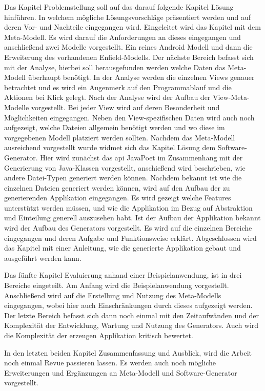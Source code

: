 Das Kapitel Problemstellung soll auf das darauf folgende Kapitel Lösung hinführen. In welchem mögliche Lösungsvorschläge präsentiert werden und auf deren Vor- und Nachteile eingegangen wird. Eingeleitet wird das Kapitel mit dem Meta-Modell. Es wird darauf die Anforderungen an dieses eingegangen und anschließend zwei Modelle vorgestellt. Ein reines Android Modell und dann die Erweiterung des vorhandenen Enfield-Modells. Der nächste Bereich befasst sich mit der Analyse, hierbei soll herausgefunden werden welche Daten das Meta-Modell überhaupt benötigt. In der Analyse werden die einzelnen Views genauer betrachtet und es wird ein Augenmerk auf den Programmablauf und die Aktionen bei Klick gelegt. Nach der Analyse wird der Aufbau der View-Meta-Modelle vorgestellt. Bei jeder View wird auf deren Besonderheit und Möglichkeiten eingegangen. Neben den View-spezifischen Daten wird auch noch aufgezeigt, welche Dateien allgemein benötigt werden und wo diese im vorgegebenen Modell platziert werden sollten. Nachdem das Meta-Modell ausreichend vorgestellt wurde widmet sich das Kapitel Lösung dem Software-Generator. Hier wird zunächst das \acf{api} JavaPoet im Zusammenhang mit der Generierung von Java-Klassen vorgestellt, anschießend wird beschrieben, wie andere Datei-Typen generiert werden können. Nachdem bekannt ist wie die einzelnen Dateien generiert werden können, wird auf den Aufbau der zu generierenden Applikation eingegangen. Es wird gezeigt welche Features unterstützt werden müssen, und wie die Applikation im Bezug auf Abstraktion und Einteilung generell auszusehen habt. Ist der Aufbau der Applikation bekannt wird der Aufbau des Generators vorgestellt. Es wird auf die einzelnen Bereiche eingegangen und deren Aufgabe und Funktionsweise erklärt. Abgeschlossen wird das Kapitel mit einer Anleitung, wie die generierte Applikation gebaut und ausgeführt werden kann.

Das fünfte Kapitel Evaluierung anhand einer Beispielanwendung, ist in drei Bereiche eingeteilt. Am Anfang wird die Beispielanwendung vorgestellt. Anschließend wird auf die Erstellung und Nutzung des Meta-Modells eingegangen, wobei hier auch Einschränkungen durch dieses aufgezeigt werden. Der letzte Bereich befasst sich dann noch einmal mit den Zeitaufwänden und der Komplexität der Entwicklung, Wartung und Nutzung des Generators. Auch wird die Komplexität der erzeugen Applikation kritisch bewertet.

In den letzten beiden Kapitel Zusammenfassung und Ausblick, wird die Arbeit noch einmal Revue passieren lassen. Es werden auch noch mögliche Erweiterungen und Ergänzungen an Meta-Modell und Software-Generator vorgestellt.
